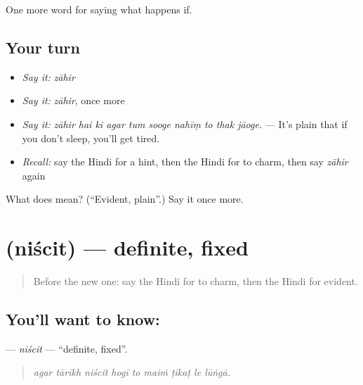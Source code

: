 \begin{grammarlens}[title={What you've built}]
One more word for saying what happens if.
\end{grammarlens}

\subsection*{Your turn}
\begin{itemize}
\raggedright
  \item \emph{Say it:} \emph{zāhir}
  \item \emph{Say it:} \emph{zāhir}, once more
  \item \emph{Say it:} \emph{zāhir hai ki agar tum sooge nahīṃ to thak jāoge.} — It's plain that if you don't sleep, you'll get tired.
  \item \emph{Recall:} say the Hindi for a hint, then the Hindi for to charm, then say \emph{zāhir} again
\end{itemize}

\begin{tcolorbox}[breakable,colback=teal!4,colframe=teal!35!black,title={Before you move on}]
What does  mean? (\textquotedblleft{}Evident, plain\textquotedblright{}.) Say it once more.
\end{tcolorbox}
\section[\texorpdfstring{\hi{निश्चित} (niścit)}{निश्चित (niścit)}]{ (niścit) — definite, fixed}

\label{lesson:HI-C376-niscit}



\begin{quote}
Before the new one: say the Hindi for to charm, then the Hindi for evident.
\end{quote}

\subsection*{You'll want to know: }
\textbf{} — \emph{niścit} — \textquotedblleft{}definite, fixed\textquotedblright{}.

\begin{quote}
        
\end{quote}

\begin{quote}
\emph{agar tārīkh niścit hogī to maiṁ ṭikaṭ le lūṅgā.}
\end{quote}

